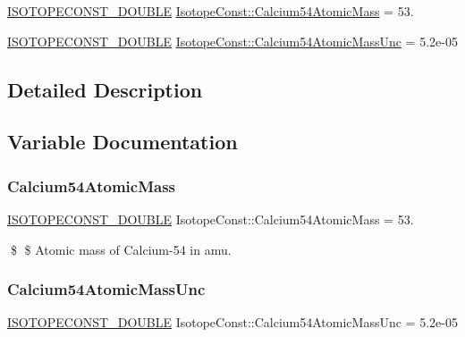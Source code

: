 \begin{DoxyCompactItemize}
\item 
\mbox{\hyperlink{group___isotope_const-_macros_ga8f45a7272ce02c0b4c65c44636ed719a}{I\+S\+O\+T\+O\+P\+E\+C\+O\+N\+S\+T\+\_\+\+D\+O\+U\+B\+LE}} \mbox{\hyperlink{group___isotope_const-_calcium-_ca54_ga46529c1e3a2c9d80c39fc532a797e08e}{Isotope\+Const\+::\+Calcium54\+Atomic\+Mass}} = 53.
\item 
\mbox{\hyperlink{group___isotope_const-_macros_ga8f45a7272ce02c0b4c65c44636ed719a}{I\+S\+O\+T\+O\+P\+E\+C\+O\+N\+S\+T\+\_\+\+D\+O\+U\+B\+LE}} \mbox{\hyperlink{group___isotope_const-_calcium-_ca54_ga1a3616795b2fe2b56221c542be01f14c}{Isotope\+Const\+::\+Calcium54\+Atomic\+Mass\+Unc}} = 5.\+2e-\/05
\end{DoxyCompactItemize}


\subsection{Detailed Description}


\subsection{Variable Documentation}
\mbox{\label{group___isotope_const-_calcium-_ca54_ga46529c1e3a2c9d80c39fc532a797e08e}} 
\subsubsection{\texorpdfstring{Calcium54\+Atomic\+Mass}{Calcium54AtomicMass}}
{\footnotesize\ttfamily \mbox{\hyperlink{group___isotope_const-_macros_ga8f45a7272ce02c0b4c65c44636ed719a}{I\+S\+O\+T\+O\+P\+E\+C\+O\+N\+S\+T\+\_\+\+D\+O\+U\+B\+LE}} Isotope\+Const\+::\+Calcium54\+Atomic\+Mass = 53.}

\$ \$ Atomic mass of Calcium-\/54 in amu. \mbox{\label{group___isotope_const-_calcium-_ca54_ga1a3616795b2fe2b56221c542be01f14c}} 
\subsubsection{\texorpdfstring{Calcium54\+Atomic\+Mass\+Unc}{Calcium54AtomicMassUnc}}
{\footnotesize\ttfamily \mbox{\hyperlink{group___isotope_const-_macros_ga8f45a7272ce02c0b4c65c44636ed719a}{I\+S\+O\+T\+O\+P\+E\+C\+O\+N\+S\+T\+\_\+\+D\+O\+U\+B\+LE}} Isotope\+Const\+::\+Calcium54\+Atomic\+Mass\+Unc = 5.\+2e-\/05}

